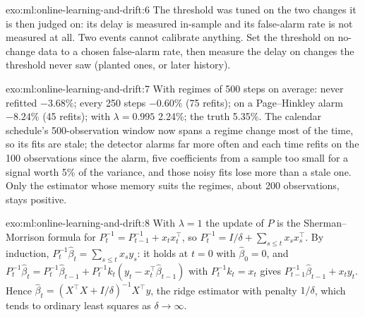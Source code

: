 \begin{solution}{exo:ml:online-learning-and-drift:6}
The threshold was tuned on the two changes it is then judged on: its delay is measured in-sample and its false-alarm
rate is not measured at all. Two events cannot calibrate anything. Set the threshold on no-change data to a chosen
false-alarm rate, then measure the delay on changes the threshold never saw (planted ones, or later history).
\end{solution}

\begin{solution}{exo:ml:online-learning-and-drift:7}
With regimes of 500 steps on average: never refitted $-3.68\%$; every 250 steps $-0.60\%$ (75 refits); on a Page--Hinkley
alarm $-8.24\%$ (45 refits);  with $\lambda = 0.995$ 2.24\%; the truth 5.35\%. The calendar schedule's
500-observation window now spans a regime change most of the time, so its fits are stale; the detector alarms far more
often and each time refits on the 100 observations since the alarm, five coefficients from a sample too small for a signal
worth 5\% of the variance, and those noisy fits lose more than a stale one. Only the estimator whose memory suits the
regimes, about 200 observations, stays positive.
\end{solution}

\begin{solution}{exo:ml:online-learning-and-drift:8}
With $\lambda = 1$ the update of $P$ is the Sherman--Morrison formula for $P_t^{-1} = P_{t-1}^{-1} + x_tx_t^\top$, so
$P_t^{-1} = I/\delta + \sum_{s\le t}x_sx_s^\top$. By induction, $P_t^{-1}\hat\beta_t = \sum_{s\le t}x_sy_s$: it holds at
$t = 0$ with $\hat\beta_0 = 0$, and $P_t^{-1}\hat\beta_t = P_t^{-1}\hat\beta_{t-1} + P_t^{-1}k_t(y_t - x_t^\top\hat\beta_{t-1})$
with $P_t^{-1}k_t = x_t$ gives $P_{t-1}^{-1}\hat\beta_{t-1} + x_ty_t$. Hence $\hat\beta_t = (X^\top X + I/\delta)^{-1}X^\top y$,
the ridge estimator with penalty $1/\delta$, which tends to ordinary least squares as $\delta\to\infty$.
\end{solution}

